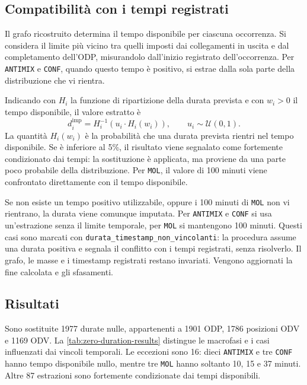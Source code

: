 \subsection{Compatibilità con i tempi registrati}
\label{sec:zero-duration-time-windows}

Il grafo ricostruito determina il tempo disponibile per ciascuna occorrenza. Si considera il limite più vicino tra quelli imposti dai collegamenti in uscita e dal completamento dell'ODP, misurandolo dall'inizio registrato dell'occorrenza. Per \texttt{ANTIMIX} e \texttt{CONF}, quando questo tempo è positivo, si estrae dalla sola parte della distribuzione che vi rientra.

Indicando con $H_i$ la funzione di ripartizione della durata prevista e con $w_i>0$ il tempo disponibile, il valore estratto è
\begin{equation}
\label{eq:zero-duration-conditional-draw}
d_i^{\mathrm{imp}}=H_i^{-1}\!\left(u_i\cdot H_i(w_i)\right),
\qquad u_i\sim\mathcal{U}(0,1).
\end{equation}
La quantità $H_i(w_i)$ è la probabilità che una durata prevista rientri nel tempo disponibile. Se è inferiore al 5\%, il risultato viene segnalato come fortemente condizionato dai tempi: la sostituzione è applicata, ma proviene da una parte poco probabile della distribuzione. Per \texttt{MOL}, il valore di 100 minuti viene confrontato direttamente con il tempo disponibile.

Se non esiste un tempo positivo utilizzabile, oppure i 100 minuti di \texttt{MOL} non vi rientrano, la durata viene comunque imputata. Per \texttt{ANTIMIX} e \texttt{CONF} si usa un'estrazione senza il limite temporale, per \texttt{MOL} si mantengono 100 minuti. Questi casi sono marcati con \texttt{durata\_timestamp\_non\_vincolanti}: la procedura assume una durata positiva e segnala il conflitto con i tempi registrati, senza risolverlo. Il grafo, le masse e i timestamp registrati restano invariati. Vengono aggiornati la fine calcolata e gli sfasamenti.

\subsection{Risultati}
\label{sec:zero-duration-results}

Sono sostituite \num{1977} durate nulle, appartenenti a \num{1901} ODP, \num{1786} posizioni ODV e \num{1169} ODV. La \cref{tab:zero-duration-results} distingue le macrofasi e i casi influenzati dai vincoli temporali. Le eccezioni sono 16: dieci \texttt{ANTIMIX} e tre \texttt{CONF} hanno tempo disponibile nullo, mentre tre \texttt{MOL} hanno soltanto 10, 15 e 37 minuti. Altre 87 estrazioni sono fortemente condizionate dai tempi disponibili.

